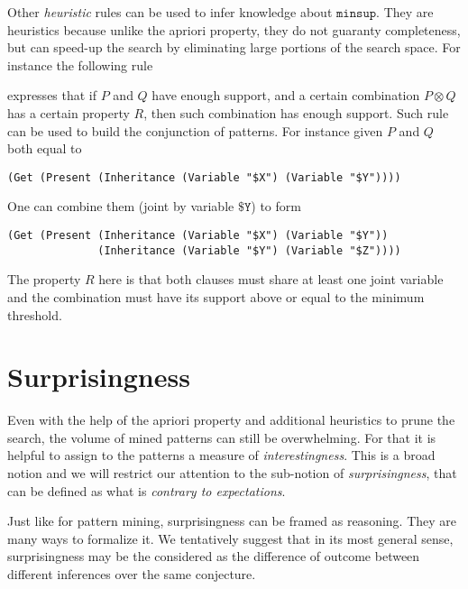 \documentclass[runningheads]{llncs}
\begin{document}
Other \emph{heuristic} rules can be used to infer knowledge about
$\texttt{minsup}$. They are heuristics because unlike the apriori
property, they do not guaranty completeness, but can speed-up the
search by eliminating large portions of the search space. For instance
the following rule
\begin{prooftree}
\end{prooftree}
expresses that if $P$ and $Q$ have enough support, and a certain
combination $P\otimes Q$ has a certain property $R$, then such
combination has enough support. Such rule can be used to build the
conjunction of patterns. For instance given $P$ and $Q$ both equal to
\begin{verbatim}
(Get (Present (Inheritance (Variable "$X") (Variable "$Y"))))
\end{verbatim}
One can combine them (joint by variable $\texttt{\$Y}$) to form
\begin{verbatim}
(Get (Present (Inheritance (Variable "$X") (Variable "$Y"))
              (Inheritance (Variable "$Y") (Variable "$Z"))))
\end{verbatim}
The property $R$ here is that both clauses must share at least one
joint variable and the combination must have its support above or
equal to the minimum threshold.

\section{Surprisingness}
\label{SUR}

Even with the help of the apriori property and additional heuristics
to prune the search, the volume of mined patterns can still be
overwhelming. For that it is helpful to assign to the patterns a
measure of \emph{interestingness}. This is a broad notion and we will
restrict our attention to the sub-notion of \emph{surprisingness},
that can be defined as what is \emph{contrary to expectations}.

Just like for pattern mining, surprisingness can be framed as
reasoning. They are many ways to formalize it.  We tentatively suggest that in its
most general sense, surprisingness may be the considered as the difference of outcome
between different inferences over the same conjecture. 
\end{document}
